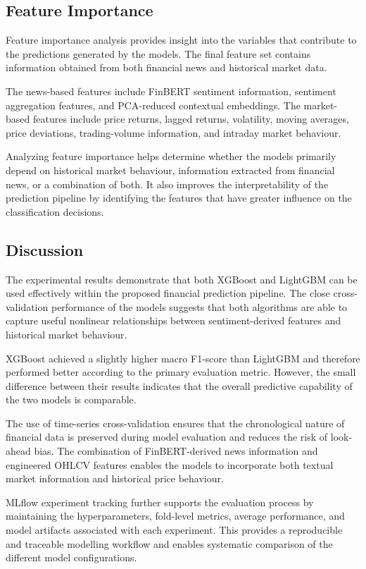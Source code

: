 \documentclass[11pt,a4paper]{article}
\begin{document}
\subsection{Feature Importance}

Feature importance analysis provides insight into the variables that
contribute to the predictions generated by the models. The final feature set
contains information obtained from both financial news and historical market
data.

The news-based features include FinBERT sentiment information, sentiment
aggregation features, and PCA-reduced contextual embeddings. The market-based
features include price returns, lagged returns, volatility, moving averages,
price deviations, trading-volume information, and intraday market behaviour.

Analyzing feature importance helps determine whether the models primarily
depend on historical market behaviour, information extracted from financial
news, or a combination of both. It also improves the interpretability of the
prediction pipeline by identifying the features that have greater influence
on the classification decisions.

\subsection{Discussion}

The experimental results demonstrate that both XGBoost and LightGBM can be
used effectively within the proposed financial prediction pipeline. The close
cross-validation performance of the models suggests that both algorithms are
able to capture useful nonlinear relationships between sentiment-derived
features and historical market behaviour.

XGBoost achieved a slightly higher macro F1-score than LightGBM and therefore
performed better according to the primary evaluation metric. However, the
small difference between their results indicates that the overall predictive
capability of the two models is comparable.

The use of time-series cross-validation ensures that the chronological nature
of financial data is preserved during model evaluation and reduces the risk
of look-ahead bias. The combination of FinBERT-derived news information and
engineered OHLCV features enables the models to incorporate both textual
market information and historical price behaviour.

MLflow experiment tracking further supports the evaluation process by
maintaining the hyperparameters, fold-level metrics, average performance, and
model artifacts associated with each experiment. This provides a reproducible
and traceable modelling workflow and enables systematic comparison of the
different model configurations.
\end{document}

